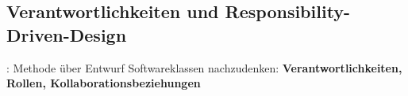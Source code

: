 \documentclass[../ZF_SWEN1.tex]{subfiles}
\begin{document}
\subsection{Verantwortlichkeiten und Responsibility-Driven-Design}:
Methode über Entwurf Softwareklassen nachzudenken:
\textcolor {yelloworange} {\textbf{Verantwortlichkeiten, Rollen, Kollaborationsbeziehungen}}
\end{document}
